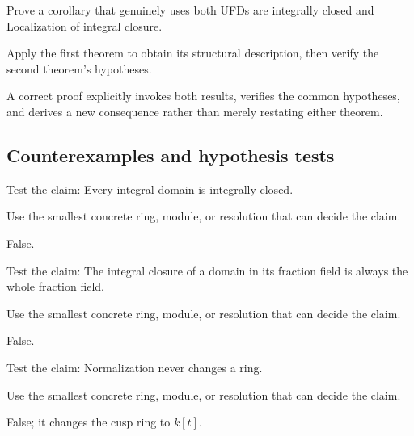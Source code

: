 \begin{exercise}\label{exr:v20-expand-09}
Prove a corollary that genuinely uses both UFDs are integrally closed and Localization of integral closure.
\end{exercise}
\begin{hint}
Apply the first theorem to obtain its structural description, then verify the second theorem's hypotheses.
\end{hint}
\begin{solution}
A correct proof explicitly invokes both results, verifies the common hypotheses, and derives a new consequence rather than merely restating either theorem.
\end{solution}

\subsection*{Counterexamples and hypothesis tests}

\begin{exercise}\label{exr:v20-expand-10}
Test the claim: Every integral domain is integrally closed.
\end{exercise}
\begin{hint}
Use the smallest concrete ring, module, or resolution that can decide the claim.
\end{hint}
\begin{solution}
False.
\end{solution}

\begin{exercise}\label{exr:v20-expand-11}
Test the claim: The integral closure of a domain in its fraction field is always the whole fraction field.
\end{exercise}
\begin{hint}
Use the smallest concrete ring, module, or resolution that can decide the claim.
\end{hint}
\begin{solution}
False.
\end{solution}

\begin{exercise}\label{exr:v20-expand-12}
Test the claim: Normalization never changes a ring.
\end{exercise}
\begin{hint}
Use the smallest concrete ring, module, or resolution that can decide the claim.
\end{hint}
\begin{solution}
False; it changes the cusp ring to $k[t]$.
\end{solution}

